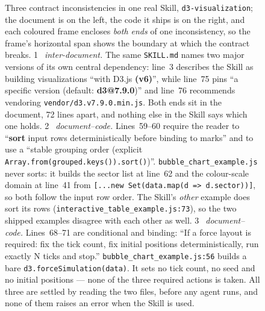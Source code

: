 \begin{figure}[t]

  \caption{Three contract inconsistencies in one real Skill,
    \texttt{d3-visualization}; the document is on the left, the code it ships is
    on the right, and each coloured frame encloses \emph{both ends} of one
    inconsistency, so the frame's horizontal span shows the boundary at which the
    contract breaks.
    \textcircled{1}~\emph{inter-document.} The same \texttt{SKILL.md} names two
    major versions of its own central dependency: line~3 describes the Skill as
    building visualizations ``with D3.js \textbf{(v6)}'', while line~75 pins ``a
    specific version (default: \textbf{d3@7.9.0})'' and line~76 recommends
    vendoring \texttt{vendor/d3.v7.9.0.min.js}. Both ends sit in the document, 72
    lines apart, and nothing else in the Skill says which one holds.
    \textcircled{2}~\emph{document--code.} Lines~59--60 require the reader to
    ``\textbf{sort} input rows deterministically before binding to marks'' and to
    use a ``stable grouping order (explicit
    \texttt{Array.from(grouped.keys()).sort()})''.
    \texttt{bubble\_chart\_example.js} never sorts: it builds the sector list at
    line~62 and the colour-scale domain at line~41 from
    \texttt{[...new Set(data.map(d => d.sector))]}, so both follow the input row
    order. The Skill's \emph{other} example does sort its rows
    (\texttt{interactive\_table\_example.js:73}), so the two shipped examples
    disagree with each other as well.
    \textcircled{3}~\emph{document--code.} Lines~68--71 are conditional and
    binding: ``If a force layout is required: fix the tick count, fix initial
    positions deterministically, run exactly N ticks and stop.''
    \texttt{bubble\_chart\_example.js:56} builds a bare
    \texttt{d3.forceSimulation(data)}. It sets no tick count, no seed and no
    initial positions --- none of the three required actions is taken.
    All three are settled by reading the two files, before any agent runs, and
    none of them raises an error when the Skill is used.}
  \label{fig:motivation}
\end{figure}
